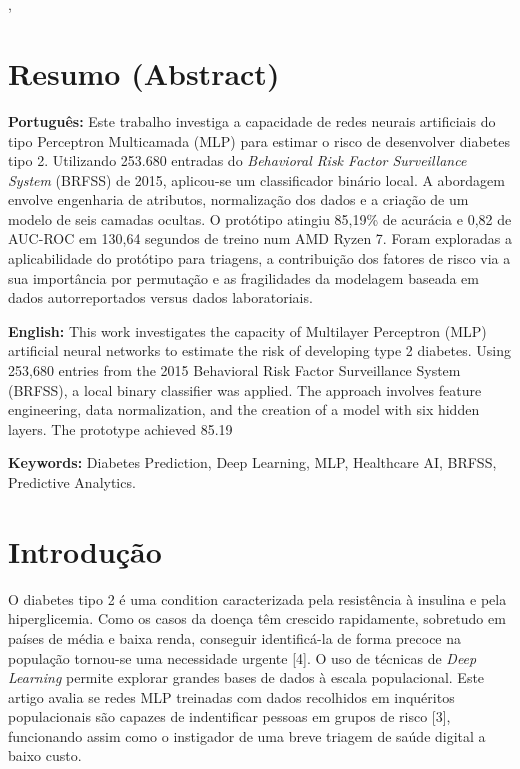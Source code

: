 \documentclass[
    12pt,
    article,
    oneside,
    a4paper,
    english,
    brazil
]{abntex2}
\renewcommand{\maketitle}{
    \begin{center}
        {\ABNTEXchapterfont\Large\imprimirtitulo} \\
        \vspace{1cm}
        {\imprimirautor} \\
        \vspace{0.5cm}
        \imprimirlocal, \imprimirdata
    \end{center}
    \vspace{1cm}
}
\begin{document}
\frenchspacing

\maketitle

\section{Resumo (Abstract)}\label{resumo-abstract}

\textbf{Português:} Este trabalho investiga a capacidade de redes neurais artificiais do tipo Perceptron Multicamada (MLP) para estimar o risco de desenvolver diabetes tipo 2. Utilizando 253.680 entradas do \emph{Behavioral Risk Factor Surveillance System} (BRFSS) de 2015, aplicou-se um classificador binário local. A abordagem envolve engenharia de atributos, normalização dos dados e a criação de um modelo de seis camadas ocultas. O protótipo atingiu 85,19\% de acurácia e 0,82 de AUC-ROC em 130,64 segundos de treino num AMD Ryzen 7. Foram exploradas a aplicabilidade do protótipo para triagens, a contribuição dos fatores de risco via a sua importância por permutação e as fragilidades da modelagem baseada em dados autorreportados versus dados laboratoriais.

\textbf{English:} This work investigates the capacity of Multilayer Perceptron (MLP) artificial neural networks to estimate the risk of developing type 2 diabetes. Using 253,680 entries from the 2015 Behavioral Risk Factor Surveillance System (BRFSS), a local binary classifier was applied. The approach involves feature engineering, data normalization, and the creation of a model with six hidden layers. The prototype achieved 85.19%

\textbf{Keywords:} Diabetes Prediction, Deep Learning, MLP, Healthcare AI, BRFSS, Predictive Analytics.


\newpage

\section{Introdução}
O diabetes tipo 2 é uma condition caracterizada pela resistência à insulina e pela hiperglicemia. Como os casos da doença têm crescido rapidamente, sobretudo em países de média e baixa renda, conseguir identificá-la de forma precoce na população tornou-se uma necessidade urgente [4].
O uso de técnicas de \emph{Deep Learning} permite explorar grandes bases de dados à escala populacional. Este artigo avalia se redes MLP treinadas com dados recolhidos em inquéritos populacionais são capazes de indentificar pessoas em grupos de risco [3], funcionando assim como o instigador de uma breve triagem de saúde digital a baixo custo.
\end{document}
